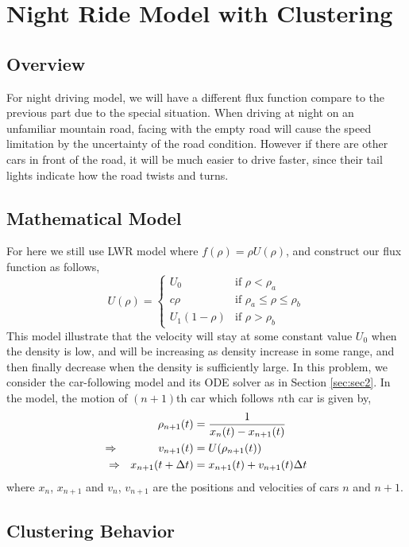 \documentclass[10pt]{article}
\begin{document}
\section{Night Ride Model with Clustering}
\subsection{Overview}

For night driving model, we will have a different flux function compare to the previous part due to the special situation. When driving at night on an unfamiliar mountain road, facing with the empty road will cause the speed limitation by the uncertainty of the road condition.
However if there are other cars in front of the road, it will be much easier to drive faster, since their tail lights indicate how the road twists and turns.
\subsection{Mathematical Model}

For here we still use LWR model where $f(\rho)=\rho U(\rho)$, and construct our flux function as follows,
\[U(\rho)=\left\{\begin{array}{lll}U_0&\text{if }\rho<\rho_a\\c\rho&\text{if }\rho_a\leq\rho\leq\rho_b\\U_1(1-\rho)&\text{if }\rho>\rho_b\end{array}\right.\]
This model illustrate that the velocity will stay at some constant value $U_0$ when the density is low, and will be increasing as density increase in some range, and then finally decrease when the density is sufficiently large.
\vskip 8pt
In this problem, we consider the car-following model and its ODE solver as in Section \ref{sec:sec2}. In the model, the motion of $(n+1)$th car which follows $n$th car is given by,
\begin{align*}
\rho_{n+1}(t) &= \frac{1}{x_n(t)-x_{n+1}(t)}\\
\Rightarrow\hskip35ptv_{n+1}(t)&=U(\rho_{n+1}(t))\\
\Rightarrow~~x_{n+1}(t+\Delta t)&=x_{n+1}(t)+v_{n+1}(t)\Delta t
\end{align*}
where $x_n$, $x_{n+1}$ and $v_n$, $v_{n+1}$ are the positions and velocities of cars $n$ and $n+1$.
\subsection{Clustering Behavior}
\end{document}
